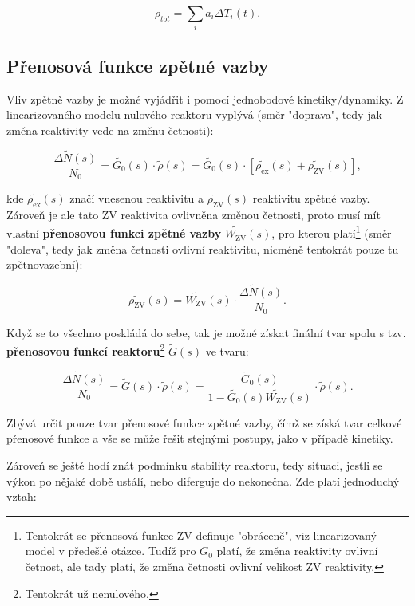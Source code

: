 \begin{equation}
  \boxed{
  \rho_{tot} = \sum_i a_i \Delta T_i (t).
  \label{zpetnovazebni_koeficient_reaktivita_1B}
  }
\end{equation}

\subsection{Přenosová funkce zpětné vazby}

Vliv zpětně vazby je možné vyjádřit i pomocí jednobodové kinetiky/dynamiky. Z linearizovaného modelu nulového reaktoru vyplývá (směr "doprava", tedy jak změna reaktivity vede na změnu četnosti):

$$ \dfrac{\Delta \tilde{N}(s)}{N_0} = \tilde{G_0}(s) \cdot \tilde{\rho}(s) = \tilde{G_0}(s) \cdot [ \tilde{\rho_\text{ex}}(s) + \tilde{\rho_\text{ZV}}(s) ], $$

kde $\tilde{\rho_\text{ex}}(s)$ značí vnesenou reaktivitu a $\tilde{\rho_\text{ZV}}(s)$ reaktivitu zpětné vazby. Zároveň je ale tato ZV reaktivita ovlivněna změnou četnosti, proto musí mít vlastní \textbf{přenosovou funkci zpětné vazby} $\tilde{W_\text{ZV}}(s)$, pro kterou platí\footnote{Tentokrát se přenosová funkce ZV definuje "obráceně", viz linearizovaný model v předešlé otázce. Tudíž pro $G_0$ platí, že změna reaktivity ovlivní četnost, ale tady platí, že změna četnosti ovlivní velikost ZV reaktivity.} (směr "doleva", tedy jak změna četnosti ovlivní reaktivitu, nicméně tentokrát pouze tu zpětnovazební):

$$ \tilde{\rho_\text{ZV}}(s) = \tilde{W_\text{ZV}}(s) \cdot \dfrac{\Delta \tilde{N}(s)}{N_0}. $$

Když se to všechno poskládá do sebe, tak je možné získat finální tvar spolu s tzv. \textbf{přenosovou funkcí reaktoru}\footnote{Tentokrát už nenulového.} $\tilde{G}(s)$ ve tvaru:

\begin{equation}
  \boxed{
    \dfrac{\Delta \tilde{N}(s)}{N_0} = \tilde{G}(s) \cdot \tilde{\rho}(s) = \dfrac{\tilde{G_0}(s)}{1 - \tilde{G_0}(s) \tilde{W_\text{ZV}}(s)} \cdot \tilde{\rho}(s).
  }
\end{equation}

Zbývá určit pouze tvar přenosové funkce zpětné vazby, čímž se získá tvar celkové přenosové funkce a vše se může řešit stejnými postupy, jako v případě kinetiky.

Zároveň se ještě hodí znát podmínku stability reaktoru, tedy situaci, jestli se výkon po nějaké době ustálí, nebo diferguje do nekonečna. Zde platí jednoduchý vztah:

